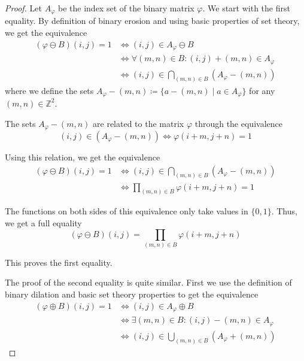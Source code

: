 \documentclass[a4paper,12pt]{article}
\theoremstyle{plain}
\theoremstyle{definition}
\theoremstyle{remark}
\begin{document}
\begin{proof}
	Let $A_\varphi$ be the index set of the binary matrix $\varphi$. We start with the first equality. By definition of binary erosion and using basic properties of set theory, we get the equivalence
	\begin{align*}
		(\varphi \ominus B)(i, j) = 1 &\Leftrightarrow (i, j) \in A_\varphi \ominus B \\
		&\Leftrightarrow \forall (m, n) \in B: (i, j) + (m, n) \in A_\varphi \\
		&\Leftrightarrow (i, j) \in \bigcap_{(m, n) \in B} ( A_\varphi - (m, n) )
	\end{align*}
	where we define the sets $A_\varphi - (m, n) \coloneqq \{ a - (m, n) \mid a \in A_\varphi \}$ for any $(m, n) \in \mathbb{Z}^2$.
	
	The sets $A_\varphi - (m, n)$ are related to the matrix $\varphi$ through the equivalence
	\begin{equation*}
		(i, j) \in ( A_\varphi - (m, n) ) \Leftrightarrow \varphi(i + m, j + n) = 1
	\end{equation*}
	
	Using this relation, we get the equivalence
	\begin{align*}
		(\varphi \ominus B)(i, j) = 1 &\Leftrightarrow (i, j) \in \bigcap_{(m, n) \in B} ( A_\varphi - (m, n) ) \\
		&\Leftrightarrow \prod_{(m, n) \in B} \varphi(i + m, j + n) = 1
	\end{align*}
	
	The functions on both sides of this equivalence only take values in $\{ 0, 1 \}$. Thus, we get a full equality
	\begin{equation*}
		(\varphi \ominus B)(i, j) = \prod_{(m, n) \in B} \varphi(i + m, j + n)
	\end{equation*}
	
	This proves the first equality.
	
	The proof of the second equality is quite similar. First we use the definition of binary dilation and basic set theory properties to get the equivalence
	\begin{align*}
		(\varphi \oplus B)(i, j) = 1 &\Leftrightarrow (i, j) \in A_\varphi \oplus B \\
		&\Leftrightarrow \exists (m, n) \in B: (i, j) - (m, n) \in A_\varphi \\
		&\Leftrightarrow (i, j) \in \bigcup_{(m, n) \in B} ( A_\varphi + (m, n) )
	\end{align*}
	

\end{proof}
\end{document}
